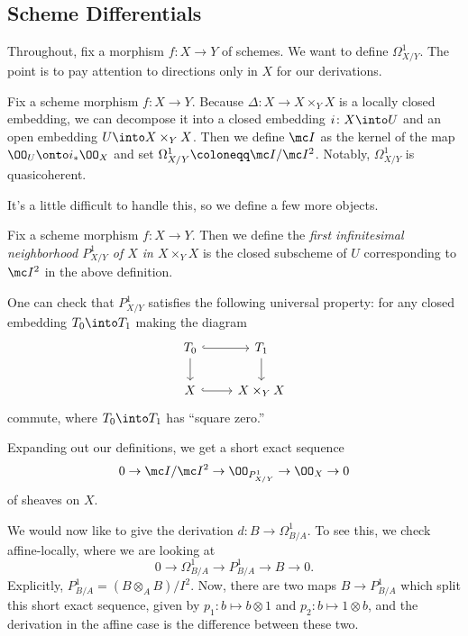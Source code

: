 \documentclass[../notes.tex]{subfiles}
\begin{document}
\subsection{Scheme Differentials}
Throughout, fix a morphism $f\colon X\to Y$ of schemes. We want to define $\Omega^1_{X/Y}$. The point is to pay attention to directions only in $X$ for our derivations.
\begin{definition}
	Fix a scheme morphism $f\colon X\to Y$. Because $\Delta\colon X\to X\times_YX$ is a locally closed embedding, we can decompose it into a closed embedding $i\colon X\into U$ and an open embedding $U\into X\times_YX$. Then we define $\mc I$ as the kernel of the map $\OO_U\onto i_*\OO_X$ and set $\Omega^1_{X/Y}\coloneqq\mc I/\mc I^2$. Notably, $\Omega^1_{X/Y}$ is quasicoherent.
\end{definition}
It's a little difficult to handle this, so we define a few more objects.
\begin{definition}
	Fix a scheme morphism $f\colon X\to Y$. Then we define the \textit{first infinitesimal neighborhood $P^1_{X/Y}$ of $X$ in $X\times_YX$} is the closed subscheme of $U$ corresponding to $\mc I^2$ in the above definition.
\end{definition}
\begin{remark}
	One can check that $P^1_{X/Y}$ satisfies the following universal property: for any closed embedding $T_0\into T_1$ making the diagram
	\[\begin{tikzcd}
		{T_0} & {T_1} \\
		X & {X\times_YX}
		\arrow[hook, from=1-1, to=1-2]
		\arrow[from=1-2, to=2-2]
		\arrow[hook, from=2-1, to=2-2]
		\arrow[from=1-1, to=2-1]
	\end{tikzcd}\]
	commute, where $T_0\into T_1$ has ``square zero.''
\end{remark}
\begin{remark}
	Expanding out our definitions, we get a short exact sequence
	\[0\to\mc I/\mc I^2\to\OO_{P^1_{X/Y}}\to\OO_X\to0\]
	of sheaves on $X$.
\end{remark}
We would now like to give the derivation $d\colon B\to\Omega^1_{B/A}$. To see this, we check affine-locally, where we are looking at
\[0\to\Omega^1_{B/A}\to P^1_{B/A}\to B\to0.\]
Explicitly, $P^1_{B/A}=(B\otimes_AB)/I^2$. Now, there are two maps $B\to P^1_{B/A}$ which split this short exact sequence, given by $p_1\colon b\mapsto b\otimes1$ and $p_2\colon b\mapsto1\otimes b$, and the derivation in the affine case is the difference between these two.
\end{document}
